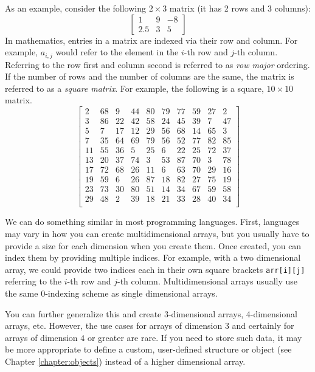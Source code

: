 As an example, consider the following $2 \times 3$ matrix (it has
2 rows and 3 columns):
\[
\begin{bmatrix}
1 & 9 & -8 \\
2.5 & 3 & 5
\end{bmatrix}
\]
In mathematics, entries in a matrix are indexed via their row and column.
For example, $a_{i,j}$ would refer to the element in the $i$-th row and
$j$-th column.  Referring to the row first and column second is referred
to as \emph{row major} ordering.  If the number of rows and the number
of columns are the same, the matrix is referred to as a \emph{square matrix}.
For example, the following is a square, $10 \times 10$ matrix.
$$\left[ \begin{array}{cccccccccc}
 2 & 68 &  9 & 44 & 80 & 79 & 77 & 59 & 27 &  2 \\
 3 & 86 & 22 & 42 & 58 & 24 & 45 & 39 &  7 & 47 \\
 5 &  7 & 17 & 12 & 29 & 56 & 68 & 14 & 65 &  3 \\
 7 & 35 & 64 & 69 & 79 & 56 & 52 & 77 & 82 & 85 \\
11 & 55 & 36 &  5 & 25 &  6 & 22 & 25 & 72 & 37 \\
13 & 20 & 37 & 74 &  3 & 53 & 87 & 70 &  3 & 78 \\
17 & 72 & 68 & 26 & 11 &  6 & 63 & 70 & 29 & 16 \\
19 & 59 &  6 & 26 & 87 & 18 & 82 & 27 & 75 & 19 \\
23 & 73 & 30 & 80 & 51 & 14 & 34 & 67 & 59 & 58 \\
29 & 48 &  2 & 39 & 18 & 21 & 33 & 28 & 40 & 34 \\
\end{array} \right]$$

We can do something similar in most programming languages.  First,
languages may vary in how you can create multidimensional arrays, but
you usually have to provide a size for each dimension when you create 
them.  Once created, you can index them by providing multiple indices.
For example, with a two dimensional array, we could provide two indices
each in their own square brackets \texttt{arr[i][j]} referring to the
$i$-th row and $j$-th column.  Multidimensional arrays usually use the 
same 0-indexing scheme as single dimensional arrays.

You can further generalize this and create 3-dimensional arrays, 4-dimensional
arrays, etc.  However, the use cases for arrays of dimension 3 and
certainly for arrays of dimension $4$ or greater are rare.  If you 
need to store such data, it may be more appropriate to define a 
custom, user-defined structure or object (see Chapter \ref{chapter:objects})
instead of a higher dimensional array.

